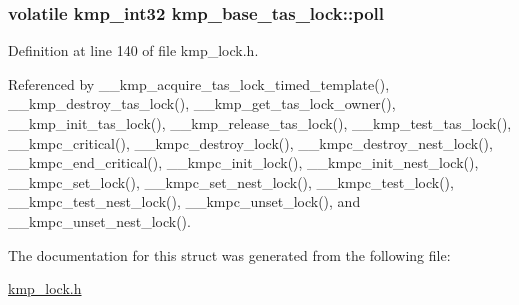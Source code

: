 \hypertarget{structkmp__base__tas__lock_a32c35f002d15ce50345770498ab6b0c0}{
\subsubsection[{poll}]{\setlength{\rightskip}{0pt plus 5cm}volatile kmp\-\_\-int32 kmp\-\_\-base\-\_\-tas\-\_\-lock\-::poll}}\label{structkmp__base__tas__lock_a32c35f002d15ce50345770498ab6b0c0}


Definition at line 140 of file kmp\-\_\-lock.\-h.



Referenced by \-\_\-\-\_\-kmp\-\_\-acquire\-\_\-tas\-\_\-lock\-\_\-timed\-\_\-template(), \-\_\-\-\_\-kmp\-\_\-destroy\-\_\-tas\-\_\-lock(), \-\_\-\-\_\-kmp\-\_\-get\-\_\-tas\-\_\-lock\-\_\-owner(), \-\_\-\-\_\-kmp\-\_\-init\-\_\-tas\-\_\-lock(), \-\_\-\-\_\-kmp\-\_\-release\-\_\-tas\-\_\-lock(), \-\_\-\-\_\-kmp\-\_\-test\-\_\-tas\-\_\-lock(), \-\_\-\-\_\-kmpc\-\_\-critical(), \-\_\-\-\_\-kmpc\-\_\-destroy\-\_\-lock(), \-\_\-\-\_\-kmpc\-\_\-destroy\-\_\-nest\-\_\-lock(), \-\_\-\-\_\-kmpc\-\_\-end\-\_\-critical(), \-\_\-\-\_\-kmpc\-\_\-init\-\_\-lock(), \-\_\-\-\_\-kmpc\-\_\-init\-\_\-nest\-\_\-lock(), \-\_\-\-\_\-kmpc\-\_\-set\-\_\-lock(), \-\_\-\-\_\-kmpc\-\_\-set\-\_\-nest\-\_\-lock(), \-\_\-\-\_\-kmpc\-\_\-test\-\_\-lock(), \-\_\-\-\_\-kmpc\-\_\-test\-\_\-nest\-\_\-lock(), \-\_\-\-\_\-kmpc\-\_\-unset\-\_\-lock(), and \-\_\-\-\_\-kmpc\-\_\-unset\-\_\-nest\-\_\-lock().



The documentation for this struct was generated from the following file\-:\begin{DoxyCompactItemize}
\item 
\hyperlink{kmp__lock_8h}{kmp\-\_\-lock.\-h}\end{DoxyCompactItemize}
